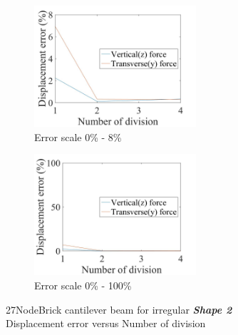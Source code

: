 \documentclass[fleqn,11pt,letter]{article}
\begin{document}
\begin{figure}[H]
  \begin{subfigure}{0.5\textwidth}
    \centering
    \includegraphics[width=6cm]{../Figure_files/27NodeBrick/error27brick_beam_irregular_shape2.jpeg}
    \caption{Error scale 0\% - 8\%}
  \end{subfigure}
  \begin{subfigure}{0.5\textwidth}
    \centering
    \includegraphics[width=6cm]{../Figure_files/27NodeBrick/error27brick_beam_irregular_shape2100.jpeg}
    \caption{Error scale 0\% - 100\%}
  \end{subfigure}
  \captionsetup{justification=centering,margin=3cm}
  \caption{27NodeBrick cantilever beam for irregular \textbf{\emph{Shape 2}}\\
      Displacement error   versus   Number of division}
  \label{fig shape 2 27NodeBrick cantilever beam for irregular more elements}
\end{figure}


\end{document}
